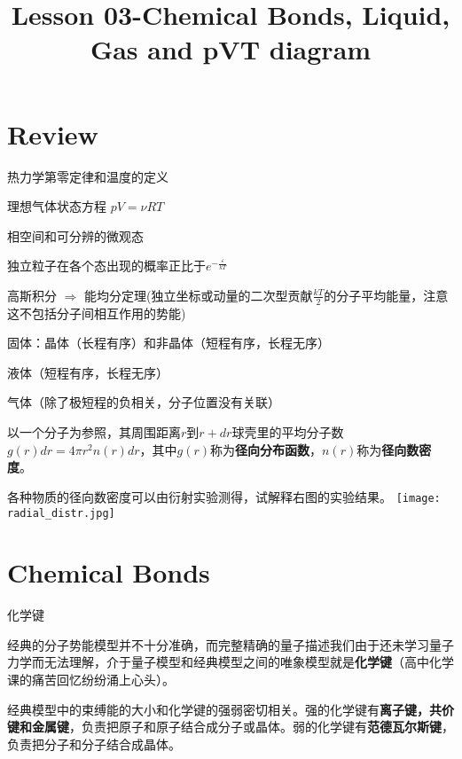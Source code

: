 \documentclass[CJK]{beamer}
\title{Lesson 03-Chemical Bonds, Liquid, Gas and pVT diagram}
\author{}
\date{}
\begin{document}

\section{Review}

\begin{frame}
\bch
\bitem
\item{热力学第零定律和温度的定义}
\item{理想气体状态方程 $pV=\nu RT$}
\item{相空间和可分辨的微观态}    
\item{独立粒子在各个态出现的概率正比于$e^{-\frac{\varepsilon}{kT}}$}
\item{高斯积分 $\Rightarrow$ 能均分定理(独立坐标或动量的二次型贡献$\frac{kT}{2}$的分子平均能量，注意这不包括分子间相互作用的势能)}    
\item{固体：晶体（长程有序）和非晶体（短程有序，长程无序）}
\item{液体（短程有序，长程无序）}
\item{气体（除了极短程的负相关，分子位置没有关联）}  
\eitem
\ech
\end{frame}




\begin{frame}
\bch

以一个分子为参照，其周围距离$r$到$r+dr$球壳里的平均分子数$g(r)dr = 4\pi r^2n(r)dr$，其中$g(r)$称为{\bf 径向分布函数}，$n(r)$称为{\bf 径向数密度}。

各种物质的径向数密度可以由衍射实验测得，试解释右图的实验结果。
\emini
{}
\texttt{[image: radial\_distr.jpg]}
\emini
\ech
\end{frame}


\section{Chemical Bonds}

\begin{frame}
  \bch
  \begin{center}
    \Huge{化学键}
    \end{center}    
\ech
\end{frame}

\begin{frame}
\bch
{\large
经典的分子势能模型并不十分准确，而完整精确的量子描述我们由于还未学习量子力学而无法理解，介于量子模型和经典模型之间的唯象模型就是{\bf 化学键}（高中化学课的痛苦回忆纷纷涌上心头\wulian）。

\skipline

 经典模型中的束缚能的大小和化学键的强弱密切相关。强的化学键有{\bf 离子键，共价键和金属键}，负责把原子和原子结合成分子或晶体。弱的化学键有{\bf 范德瓦尔斯键}，负责把分子和分子结合成晶体。}
\ech
\end{frame}
\end{document}
